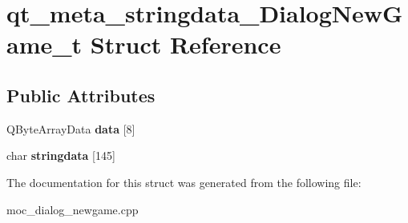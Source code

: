 \hypertarget{structqt__meta__stringdata__DialogNewGame__t}{\section{qt\-\_\-meta\-\_\-stringdata\-\_\-\-Dialog\-New\-Game\-\_\-t Struct Reference}
\label{structqt__meta__stringdata__DialogNewGame__t}
}
\subsection*{Public Attributes}
\begin{DoxyCompactItemize}
\item 
\hypertarget{structqt__meta__stringdata__DialogNewGame__t_a250422d30137e544be75480c7d5e200e}{Q\-Byte\-Array\-Data {\bfseries data} \mbox{[}8\mbox{]}}\label{structqt__meta__stringdata__DialogNewGame__t_a250422d30137e544be75480c7d5e200e}

\item 
\hypertarget{structqt__meta__stringdata__DialogNewGame__t_a40b8f464e548213188a5ace9e8f271f2}{char {\bfseries stringdata} \mbox{[}145\mbox{]}}\label{structqt__meta__stringdata__DialogNewGame__t_a40b8f464e548213188a5ace9e8f271f2}

\end{DoxyCompactItemize}


The documentation for this struct was generated from the following file\-:\begin{DoxyCompactItemize}
\item 
moc\-\_\-dialog\-\_\-newgame.\-cpp\end{DoxyCompactItemize}
